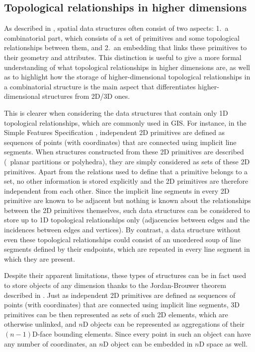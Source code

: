 \subsection{Topological relationships in higher dimensions}
\label{ss:nd-topology}

As described in , spatial data structures often consist of two aspects: 1.\ a combinatorial part, which consists of a set of primitives and some topological relationships between them, and 2.\ an embedding that links these primitives to their geometry and attributes.
This distinction is useful to give a more formal understanding of what topological relationships in higher dimensions are, as well as to highlight how the storage of higher-dimensional topological relationships in a combinatorial structure is the main aspect that differentiates higher-dimensional structures from 2D/3D ones.

This is clearer when considering the data structures that contain only 1D topological relationships, which are commonly used in GIS.\@
For instance, in the Simple Features Specification \citep{SimpleFeatures1}, independent 2D primitives are defined as sequences of points (with coordinates) that are connected using implicit line segments.
When structures constructed from these 2D primitives are described (\eg\ planar partitions or polyhedra), they are simply considered as sets of these 2D primitives.
Apart from the relations used to define that a primitive belongs to a set, no other information is stored explicitly and the 2D primitives are therefore independent from each other.
Since the implicit line segments in every 2D primitive are known to be adjacent but nothing is known about the relationships between the 2D primitives themselves, such data structures can be considered to store up to 1D topological relationships only (adjacencies between edges and the incidences between edges and vertices).
By contrast, a data structure without even these topological relationships could consist of an unordered soup of line segments defined by their endpoints, which are repeated in every line segment in which they are present.

Despite their apparent limitations, these types of structures can be in fact used to store objects of any dimension thanks to the Jordan-Brouwer theorem \citep{Lebesgue11,Brouwer11} described in .
Just as independent 2D primitives are defined as sequences of points (with coordinates) that are connected using implicit line segments, 3D primitives can be then represented as sets of such 2D elements, which are otherwise unlinked, and $n$D objects can be represented as aggregations of their $(n-1)$D-face bounding elements.
Since every point in such an object can have any number of coordinates, an $n$D object can be embedded in $n$D space as well.

